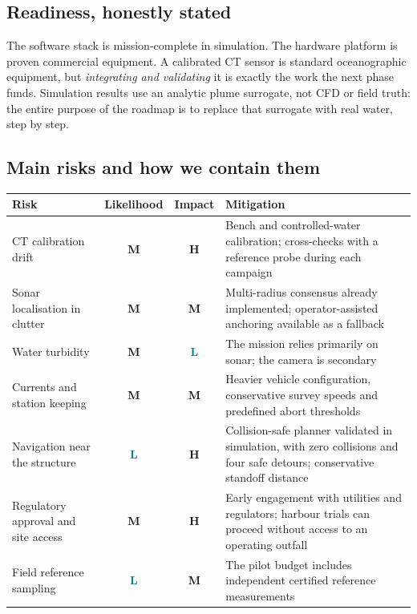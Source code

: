 \documentclass[10pt,a4paper]{article}
\newcommand{\chipL}{\textcolor{teal}{\sffamily\bfseries L}}
\newcommand{\chipM}{\textcolor{accent}{\sffamily\bfseries M}}
\newcommand{\chipH}{\textcolor{red!65!black}{\sffamily\bfseries H}}
\begin{document}
\subsection*{\sffamily\color{deepblue}Readiness, honestly stated}

The software stack is mission-complete in simulation. The hardware platform is proven
commercial equipment. A calibrated CT sensor is standard oceanographic equipment, but
\emph{integrating and validating} it is exactly
the work the next phase funds. Simulation results use an analytic plume surrogate, not CFD or
field truth: the entire purpose of the roadmap is to replace that surrogate with real water,
step by step.

\subsection*{\sffamily\color{deepblue}Main risks and how we contain them}

\begin{center}
\small\sffamily
\renewcommand{\arraystretch}{1.5}
\begin{tabularx}{\textwidth}{@{}p{3.8cm}cc>{\raggedright\arraybackslash}X@{}}
\toprule
\textbf{\color{deepblue}Risk} & \textbf{\color{deepblue}Likelihood} & \textbf{\color{deepblue}Impact} & \textbf{\color{deepblue}Mitigation}\\
\midrule
CT calibration drift & \chipM & \chipH & Bench and controlled-water calibration; cross-checks with a reference probe during each campaign\\
Sonar localisation in clutter & \chipM & \chipM & Multi-radius consensus already implemented; operator-assisted anchoring available as a fallback\\
Water turbidity & \chipM & \chipL & The mission relies primarily on sonar; the camera is secondary\\
Currents and station keeping & \chipM & \chipM & Heavier vehicle configuration, conservative survey speeds and predefined abort thresholds\\
Navigation near the structure & \chipL & \chipH & Collision-safe planner validated in simulation, with zero collisions and four safe detours; conservative standoff distance\\
Regulatory approval and site access & \chipM & \chipH & Early engagement with utilities and regulators; harbour trials can proceed without access to an operating outfall\\
Field reference sampling & \chipL & \chipM & The pilot budget includes independent certified reference measurements\\
\bottomrule
\end{tabularx}
\end{center}
\end{document}
